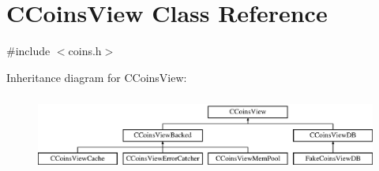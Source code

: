 \hypertarget{class_c_coins_view}{}\section{C\+Coins\+View Class Reference}
\label{class_c_coins_view}


{\ttfamily \#include $<$coins.\+h$>$}

Inheritance diagram for C\+Coins\+View\+:\begin{figure}[H]
\begin{center}
\leavevmode
\includegraphics[height=2.560976cm]{class_c_coins_view}
\end{center}
\end{figure}
